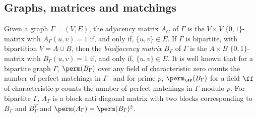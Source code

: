 \documentclass{toc}
\begin{document}
\subsection{Graphs, matrices and matchings}
Given a graph $\Gamma = (V,E)$, the adjacency matrix $A_G$ of $\Gamma$ is the $V \times V$ $\{0,1\}$-matrix with $A_\Gamma(u,v) = 1$ if, and only if, $\{u,v\} \in E$.  If $\Gamma$ is bipartite, with bipartition $V = A \cup B$, then the \emph{biadjacency matrix} $B_\Gamma$ of $\Gamma$ is the $A \times B$ $\{0,1\}$-matrix with $B_\Gamma(u,v) = 1$ if, and only if, $\{u,v\} \in E$.
It is well known that for a bipartite graph $\Gamma$, $\perm(B_\Gamma)$ over any field of characteristic zero counts the number of perfect matchings in $\Gamma$~\cite{Harary69} and for prime $p$, $\perm_{\ff}(B_\Gamma)$ for a field $\ff$ of characteristic $p$ counts the number of perfect matchings in $\Gamma$ modulo $p$. For bipartite $\Gamma$, 
$A_\Gamma$ is a block anti-diagonal matrix with two blocks corresponding to $B_\Gamma$ and $B_\Gamma^T$ and $\perm(A_\Gamma) = \perm(B_\Gamma)^2$.
\end{document}
